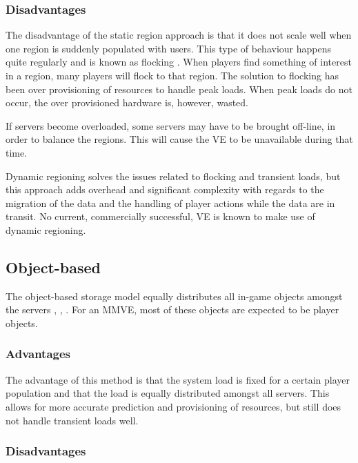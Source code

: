 \subsubsection{Disadvantages}

The disadvantage of the static region approach is that it does not scale well when one region is suddenly populated with users. This type of behaviour happens quite regularly and is known as flocking \cite{flocking}. When players find something of interest in a region, many players will flock to that region. The solution to flocking has been over provisioning of resources to handle peak loads. When peak loads do not occur, the over provisioned hardware is, however, wasted.

If servers become overloaded, some servers may have to be brought off-line, in order to balance the regions. This will cause the VE to be unavailable during that time.

Dynamic regioning solves the issues related to flocking and transient loads, but this approach adds overhead and significant complexity with regards to the migration of the data and the handling of player actions while the data are in transit. No current, commercially successful, VE is known to make use of dynamic regioning.

\subsection{Object-based}

The object-based storage model equally distributes all in-game objects amongst the servers \cite{object_based_consistency1}, \cite{object_based_consistency2}, \cite{object_based_consistency3}. For an MMVE, most of these objects are expected to be player objects.

\subsubsection{Advantages}

The advantage of this method is that the system load is fixed for a certain player population and that the load is equally distributed amongst all servers. This allows for more accurate prediction and provisioning of resources, but still does not handle transient loads well.

\subsubsection{Disadvantages}

